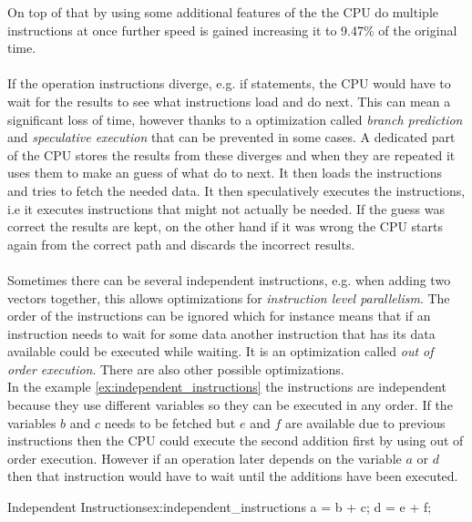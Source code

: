 \documentclass[10pt,a4paper]{report}
\newcounter{example}
\begin{document}
On top of that by using some additional features of the the CPU do multiple instructions at once further speed is gained increasing it to 9.47\% of the original time\cite{drepper2007cpumemory}. \\
\\
If the operation instructions diverge, e.g. if statements, the CPU would have to wait for the results to see what instructions load and do next\cite{drepper2007cpumemory}. This can mean a significant loss of time, however thanks to a optimization called \emph{branch prediction} and \emph{speculative execution} that can be prevented in some cases\cite{drepper2007cpumemory}. A dedicated part of the CPU stores the results from these diverges and when they are repeated it uses them to make an guess of what do to next\cite{drepper2007cpumemory}. It then loads the instructions and tries to fetch the needed data\cite{drepper2007cpumemory}. It then speculatively executes the instructions, i.e it executes instructions that might not actually be needed\cite{drepper2007cpumemory}. If the guess was correct the results are kept, on the other hand if it was wrong the CPU starts again from the correct path and discards the incorrect results\cite{drepper2007cpumemory}.\\
\\
Sometimes there can be several independent instructions, e.g. when adding two vectors together, this allows optimizations for \emph{instruction level parallelism}\cite{introduction_hpc_hager}. The order of the instructions can be ignored which for instance means that if an instruction needs to wait for some data another instruction that has its data available could be executed while waiting\cite{introduction_hpc_hager}. It is an optimization called \emph{out of order execution}\cite{introduction_hpc_hager}. There are also other possible optimizations\cite{introduction_hpc_hager}.
\\
In the example \ref{ex:independent_instructions} the instructions are independent because they use different variables so they can be executed in any order. If the variables $b$ and $c$ needs to be fetched but $e$ and $f$ are available due to previous instructions then the CPU could execute the second addition first by using out of order execution. However if an operation later depends on the variable $a$ or $d$ then that instruction would have to wait until the additions have been executed.

\begin{example}{Independent Instructions}{ex:independent_instructions}
a = b + c;
d = e + f;
\end{example}
\end{document}
